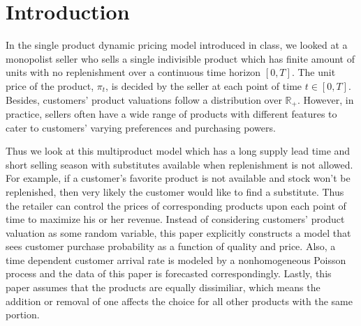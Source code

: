 


\section{Introduction}

In the single product dynamic pricing model introduced in class, we looked at a monopolist seller who sells a single indivisible product which has finite amount of units with no replenishment over a continuous time horizon $[0,T]$. The unit price of the product, $\pi_t$, is decided by the seller at each point of time $t \in [0,T]$. Besides, customers' product valuations follow a distribution over $\mathbb{R}_+$. However, in practice, sellers often have a wide range of products with different features to cater to customers' varying preferences and purchasing powers. 

Thus we look at this multiproduct model \cite{Li2009} which has a long supply lead time and short selling season with substitutes available when replenishment is not allowed. For example, if a customer's favorite product is not available and stock won't be replenished, then very likely the customer would like to find a substitute. Thus the retailer can control the prices of corresponding products upon each point of time to maximize his or her revenue. Instead of considering customers' product valuation as some random variable, this paper explicitly constructs a model that sees customer purchase probability as a function of quality and price. Also, a time dependent customer arrival rate is modeled by a nonhomogeneous Poisson process and the data of this paper is forecasted correspondingly. Lastly, this paper assumes that the products are equally dissimiliar, which means the addition or removal of one affects the choice for all other products with the same portion.







